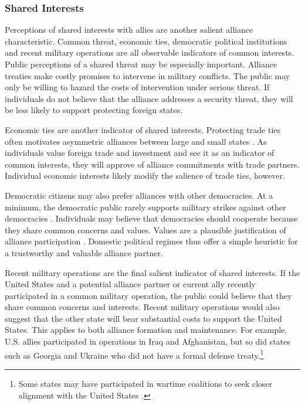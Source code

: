 \documentclass[12pt]{article}
\begin{document}
\subsubsection*{Shared Interests}

Perceptions of shared interests with allies are another salient alliance characteristic. 
Common threat, economic ties, democratic political institutions and recent military operations are all observable indicators of common interests. 
Public perceptions of a shared threat may be especially important. 
Alliance treaties make costly promises to intervene in military conflicts. 
The public may only be willing to hazard the costs of intervention under serious threat. 
If individuals do not believe that the alliance addresses a security threat, they will be less likely to support protecting foreign states. 


Economic ties are another indicator of shared interests. 
Protecting trade ties often motivates asymmetric alliances between large and small states \citep{Fordham2010}. 
As individuals value foreign trade and investment and see it as an indicator of common interests, they will approve of alliance commitments with trade partners.
Individual economic interests likely modify the salience of trade ties, however.


Democratic citizens may also prefer alliances with other democracies. 
At a minimum, the democratic public rarely supports military strikes against other democracies \citep{TomzWeeks2013}. 
Individuals may believe that democracies should cooperate because they share common concerns and values. 
Values are a plausible justification of alliance participation \citep{Chuetal2021}. 
Domestic political regimes thus offer a simple heuristic for a trustworthy and valuable alliance partner. 


Recent military operations are the final salient indicator of shared interests. 
If the United States and a potential alliance partner or current ally recently participated in a common military operation, the public could believe that they share common concerns and interests. 
Recent military operations would also suggest that the other state will bear substantial costs to support the United States. 
This applies to both alliance formation and maintenance. 
For example, U.S. allies participated in operations in Iraq and Afghanistan, but so did states such as Georgia and Ukraine who did not have a formal defense treaty.\footnote{Some states may have participated in wartime coalitions to seek closer alignment with the United States \citep{GannonKent2020}.}
\end{document}
